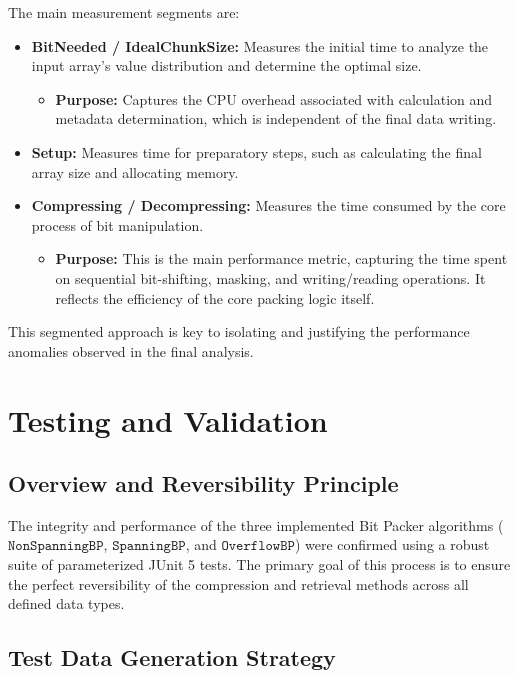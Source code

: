 \documentclass[11pt, a4paper]{article}
\begin{document}
	The main measurement segments are:
	
	\begin{itemize}
		\item \textbf{BitNeeded / IdealChunkSize:} Measures the initial time to analyze the input array's value distribution and determine the optimal size.
		\begin{itemize}
			\item \textbf{Purpose:} Captures the CPU overhead associated with calculation and metadata determination, which is independent of the final data writing.
		\end{itemize}
		
		\item \textbf{Setup:} Measures time for preparatory steps, such as calculating the final array size and allocating memory.
		
		\item \textbf{Compressing / Decompressing:} Measures the time consumed by the core process of bit manipulation.
		\begin{itemize}
			\item \textbf{Purpose:} This is the main performance metric, capturing the time spent on sequential bit-shifting, masking, and writing/reading operations. It reflects the efficiency of the core packing logic itself.
		\end{itemize}
	\end{itemize}
	This segmented approach is key to isolating and justifying the performance anomalies observed in the final analysis.
	
	\section{Testing and Validation}
	\label{sec:testing_validation}
	
	\subsection{Overview and Reversibility Principle}
	\label{sec:overview_principle}
	
	The integrity and performance of the three implemented Bit Packer algorithms ($\texttt{NonSpanningBP}$, $\texttt{SpanningBP}$, and $\texttt{OverflowBP}$) were confirmed using a robust suite of parameterized JUnit 5 tests. The primary goal of this process is to ensure the perfect reversibility of the compression and retrieval methods across all defined data types.
	
	\subsection{Test Data Generation Strategy}
	\label{sec:data_generation_strategy}
	
\end{document}
